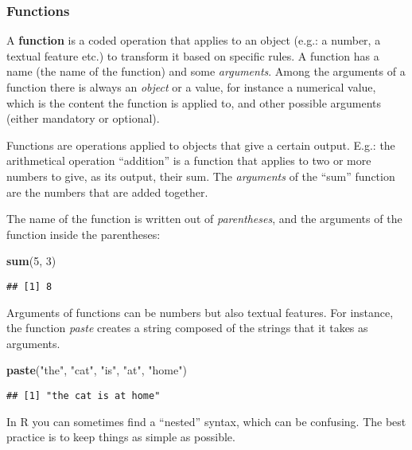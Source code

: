 \documentclass[
]{article}
\newenvironment{Shaded}{\begin{snugshade}}{\end{snugshade}}
\newcommand{\DecValTok}[1]{\textcolor[rgb]{0.00,0.00,0.81}{#1}}
\newcommand{\FunctionTok}[1]{\textcolor[rgb]{0.13,0.29,0.53}{\textbf{#1}}}
\newcommand{\NormalTok}[1]{#1}
\newcommand{\StringTok}[1]{\textcolor[rgb]{0.31,0.60,0.02}{#1}}
\begin{document}
\subsubsection{Functions}\label{functions}

A \textbf{function} is a coded operation that applies to an object (e.g.: a number, a textual feature etc.) to transform it based on specific rules. A function has a name (the name of the function) and some \emph{arguments}. Among the arguments of a function there is always an \emph{object} or a value, for instance a numerical value, which is the content the function is applied to, and other possible arguments (either mandatory or optional).

Functions are operations applied to objects that give a certain output. E.g.: the arithmetical operation ``addition'' is a function that applies to two or more numbers to give, as its output, their sum. The \emph{arguments} of the ``sum'' function are the numbers that are added together.

The name of the function is written out of \emph{parentheses}, and the arguments of the function inside the parentheses:

\begin{Shaded}
\begin{Highlighting}[]
\FunctionTok{sum}\NormalTok{(}\DecValTok{5}\NormalTok{, }\DecValTok{3}\NormalTok{)}
\end{Highlighting}
\end{Shaded}

\begin{verbatim}
## [1] 8
\end{verbatim}

Arguments of functions can be numbers but also textual features. For instance, the function \emph{paste} creates a string composed of the strings that it takes as arguments.

\begin{Shaded}
\begin{Highlighting}[]
\FunctionTok{paste}\NormalTok{(}\StringTok{"the"}\NormalTok{, }\StringTok{"cat"}\NormalTok{, }\StringTok{"is"}\NormalTok{, }\StringTok{"at"}\NormalTok{, }\StringTok{"home"}\NormalTok{)}
\end{Highlighting}
\end{Shaded}

\begin{verbatim}
## [1] "the cat is at home"
\end{verbatim}

In R you can sometimes find a ``nested'' syntax, which can be confusing. The best practice is to keep things as simple as possible.
\end{document}
